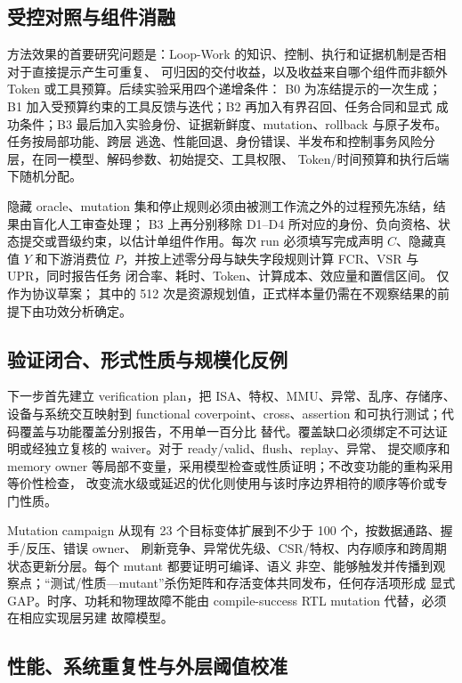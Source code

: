 \documentclass[UTF8,a4paper,zihao=-4,oneside]{ctexart}
\newcommand{\taskpath}[1]{\path{#1}}
\begin{document}
\subsection{受控对照与组件消融}

方法效果的首要研究问题是：Loop-Work 的知识、控制、执行和证据机制是否相对于直接提示产生可重复、
可归因的交付收益，以及收益来自哪个组件而非额外 Token 或工具预算。后续实验采用四个递增条件：
B0 为冻结提示的一次生成；B1 加入受预算约束的工具反馈与迭代；B2 再加入有界召回、任务合同和显式
成功条件；B3 最后加入实验身份、证据新鲜度、mutation、rollback 与原子发布。任务按局部功能、跨层
逃逸、性能回退、身份错误、半发布和控制事务风险分层，在同一模型、解码参数、初始提交、工具权限、
Token/时间预算和执行后端下随机分配。

隐藏 oracle、mutation 集和停止规则必须由被测工作流之外的过程预先冻结，结果由盲化人工审查处理；
B3 上再分别移除 D1--D4 所对应的身份、负向资格、状态提交或晋级约束，以估计单组件作用。每次 run
必须填写完成声明 $C$、隐藏真值 $Y$ 和下游消费位 $P$，并按上述零分母与缺失字段规则计算 FCR、VSR
与 UPR，同时报告任务
闭合率、耗时、Token、计算成本、效应量和置信区间。\taskpath{experiment-plan.md} 仅作为协议草案；
其中的 512 次是资源规划值，正式样本量仍需在不观察结果的前提下由功效分析确定。

\subsection{验证闭合、形式性质与规模化反例}

下一步首先建立 verification plan，把 ISA、特权、MMU、异常、乱序、存储序、设备与系统交互映射到
functional coverpoint、cross、assertion 和可执行测试；代码覆盖与功能覆盖分别报告，不用单一百分比
替代。覆盖缺口必须绑定不可达证明或经独立复核的 waiver。对于 ready/valid、flush、replay、异常、
提交顺序和 memory owner 等局部不变量，采用模型检查或性质证明；不改变功能的重构采用等价性检查，
改变流水级或延迟的优化则使用与该时序边界相符的顺序等价或专门性质。

Mutation campaign 从现有 23 个目标变体扩展到不少于 100 个，按数据通路、握手/反压、错误 owner、
刷新竞争、异常优先级、CSR/特权、内存顺序和跨周期状态更新分层。每个 mutant 都要证明可编译、语义
非空、能够触发并传播到观察点；“测试/性质---mutant”杀伤矩阵和存活变体共同发布，任何存活项形成
显式 GAP。时序、功耗和物理故障不能由 compile-success RTL mutation 代替，必须在相应实现层另建
故障模型。

\subsection{性能、系统重复性与外层阈值校准}
\end{document}
